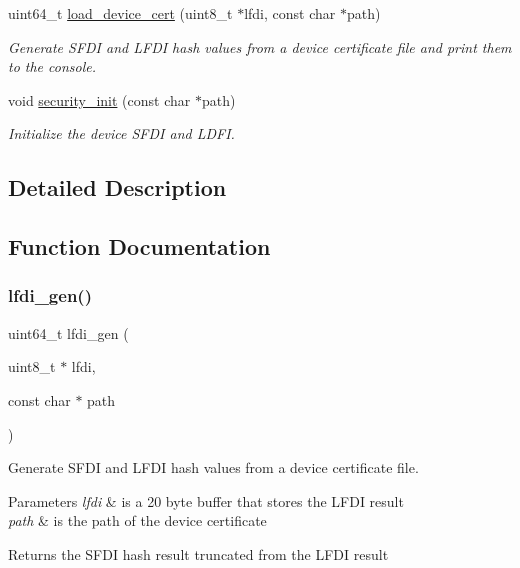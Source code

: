 \begin{DoxyCompactItemize}
uint64\+\_\+t \hyperlink{group__security_ga85dca7ededd3e531ce19183751f71ff4}{load\+\_\+device\+\_\+cert} (uint8\+\_\+t $\ast$lfdi, const char $\ast$path)
\begin{DoxyCompactList}\small\item\em Generate S\+F\+DI and L\+F\+DI hash values from a device certificate file and print them to the console. \end{DoxyCompactList}\item 
void \hyperlink{group__security_ga37aa027507f0512a802bc034def54576}{security\+\_\+init} (const char $\ast$path)
\begin{DoxyCompactList}\small\item\em Initialize the device S\+F\+DI and L\+D\+FI. \end{DoxyCompactList}\end{DoxyCompactItemize}


\subsection{Detailed Description}


\subsection{Function Documentation}
\mbox{\label{group__security_ga6dbafb6acf80fc86e418814b288a7e1a}} 
\subsubsection{\texorpdfstring{lfdi\+\_\+gen()}{lfdi\_gen()}}
{\footnotesize\ttfamily uint64\+\_\+t lfdi\+\_\+gen (\begin{DoxyParamCaption}\item[{uint8\+\_\+t $\ast$}]{lfdi,  }\item[{const char $\ast$}]{path }\end{DoxyParamCaption})}



Generate S\+F\+DI and L\+F\+DI hash values from a device certificate file. 


\begin{DoxyParams}{Parameters}
{\em lfdi} & is a 20 byte buffer that stores the L\+F\+DI result \\
\hline
{\em path} & is the path of the device certificate \\
\hline
\end{DoxyParams}
\begin{DoxyReturn}{Returns}
the S\+F\+DI hash result truncated from the L\+F\+DI result 
\end{DoxyReturn}
\mbox{\label{group__security_ga0c3b1ec1fd87c9cfb07b82f97655ed1f}} 
